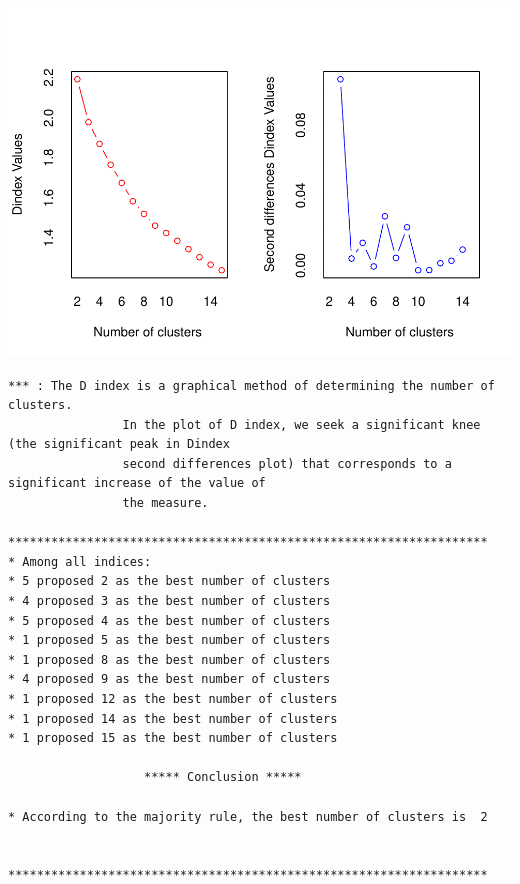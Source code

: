 \documentclass[
]{article}
\begin{document}
\includegraphics{Projet_files/figure-latex/unnamed-chunk-19-2.pdf}

\begin{verbatim}
*** : The D index is a graphical method of determining the number of clusters. 
                In the plot of D index, we seek a significant knee (the significant peak in Dindex
                second differences plot) that corresponds to a significant increase of the value of
                the measure. 
 
******************************************************************* 
* Among all indices:                                                
* 5 proposed 2 as the best number of clusters 
* 4 proposed 3 as the best number of clusters 
* 5 proposed 4 as the best number of clusters 
* 1 proposed 5 as the best number of clusters 
* 1 proposed 8 as the best number of clusters 
* 4 proposed 9 as the best number of clusters 
* 1 proposed 12 as the best number of clusters 
* 1 proposed 14 as the best number of clusters 
* 1 proposed 15 as the best number of clusters 

                   ***** Conclusion *****                            
 
* According to the majority rule, the best number of clusters is  2 
 
 
******************************************************************* 
\end{verbatim}
\end{document}
